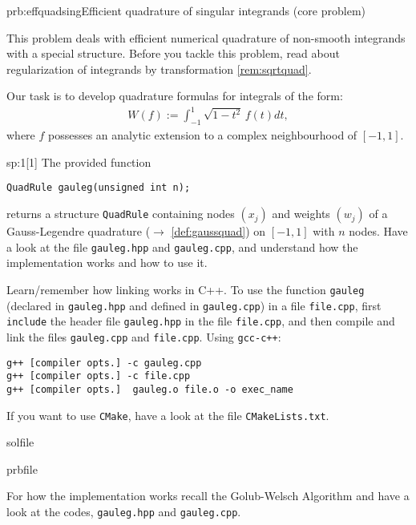 
\begin{samproblem}{prb:effquadsing}{Efficient quadrature of singular integrands (core problem)}{
 This problem deals with efficient numerical quadrature of non-smooth integrands with a special structure.
 Before you tackle this problem, read about regularization of integrands by transformation \cref{rem:sqrtquad}.

 Our task is to develop quadrature formulas for integrals of the form:
 \begin{align} \label{eq:effquadsingint}
  W(f) := \int_{-1}^1 \sqrt{1 - t^2}\, f(t) dt,
 \end{align}
 where $f$ possesses an analytic extension to a complex neighbourhood of $[-1,1]$.
}

\begin{subproblem}{sp:1}[1]
  The provided function
  \begin{lstlisting}[style=cpp]
QuadRule gauleg(unsigned int n);
  \end{lstlisting}
  returns a structure \verb|QuadRule| containing nodes $(x_j)$ and weights $(w_j)$
  of a Gauss-Legendre quadrature ($\to$ \cref{def:gaussquad}) on $[-1,1]$ with $n$ nodes. 
  Have a look at the file \verb|gauleg.hpp| and \verb|gauleg.cpp|, 
  and understand how the implementation works and how to use it.
 
  \begin{samhint}
    Learn/remember how linking works in C++. To use the function \verb|gauleg| 
    (declared in \verb|gauleg.hpp| and defined in \verb|gauleg.cpp|) in a file \verb|file.cpp|, 
    first \verb|include| the header file \verb|gauleg.hpp| in the file \verb|file.cpp|, 
    and then compile and link the files \verb|gauleg.cpp| and \verb|file.cpp|. Using \verb|gcc-c++|:
    \begin{lstlisting}
g++ [compiler opts.] -c gauleg.cpp
g++ [compiler opts.] -c file.cpp
g++ [compiler opts.]  gauleg.o file.o -o exec_name
    \end{lstlisting}
    If you want to use \verb|CMake|, have a look at the file \verb|CMakeLists.txt|.
  \end{samhint}
 
  \begin{samwriteprbpart}{solfile}
    \begin{writeverbatim}{prbfile}
      \begin{samsolution}
        For how the implementation works recall the Golub-Welsch Algorithm and have a look 
        at the codes, \verb|gauleg.hpp| and \verb|gauleg.cpp|.


\end{samsolution}
\end{writeverbatim}
\end{samwriteprbpart}
\end{subproblem}
\end{samproblem}
